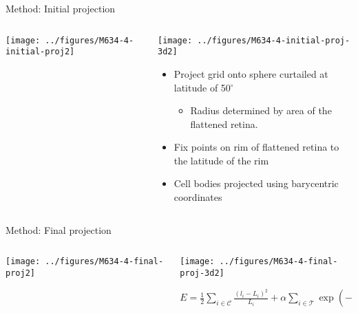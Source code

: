 \documentclass[final,hyperref={pdfpagelabels=false}]{beamer}
\begin{document}
\begin{frame}{}
\begin{columns}[T]
\begin{column}{.33\linewidth}
      \begin{block}{Method: Initial projection}
        \begin{columns}
          \begin{column}{0.4\linewidth}
            \texttt{[image: ../figures/M634-4-initial-proj2]}
          \end{column}
          \begin{column}{0.55\linewidth}
            \texttt{[image: ../figures/M634-4-initial-proj-3d2]}  

            \begin{itemize}
            \item Project grid onto sphere curtailed at latitude of 50$^\circ$
              \begin{itemize}
              \item Radius determined by area of the flattened retina.
              \end{itemize}
            \item Fix points on rim of flattened retina to the
              latitude of the rim 
            \item Cell bodies projected using barycentric coordinates
            \end{itemize}
          \end{column}
        \end{columns}
      \end{block}

      \begin{block}{Method: Final projection}
        \begin{columns}
          \begin{column}{0.4\linewidth}
            \texttt{[image: ../figures/M634-4-final-proj2]}
          \end{column}
          \begin{column}{0.55\linewidth}
            \texttt{[image: ../figures/M634-4-final-proj-3d2]}


            $E = \frac{1}{2} \sum_{i\in\mathcal{C}} \frac{(l_i -
              L_i)^2}{L_i}  + \alpha\sum_{i\in\mathcal{T}} \exp(-k\frac{a_i}{A_i})
            $
            

\end{column}
\end{columns}
\end{block}
\end{column}
\end{columns}
\end{frame}
\end{document}
